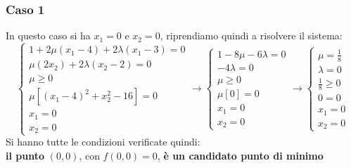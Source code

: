 \documentclass[a4paper,12pt, oneside]{book}
\begin{document}
\subsubsection{Caso 1}
In questo caso si ha $x_1=0$ e $x_2=0$, riprendiamo quindi a risolvere
il sistema:
\[\begin{cases}
    1+2\mu(x_1-4)+2\lambda(x_1-3)=0\\
    \mu(2x_2)+2\lambda(x_2-2)=0\\
    \mu\geq 0\\
    \mu[(x_1-4)^2+x_2^2-16]=0\\
    x_1=0 \\
    x_2=0
  \end{cases}\to
  \begin{cases}
    1-8\mu-6\lambda=0\\
    -4\lambda=0\\
    \mu\geq 0\\
    \mu[0]=0\\
    x_1=0 \\
    x_2=0
  \end{cases}\to
    \begin{cases}
    \mu=\frac{1}{8}\\
    \lambda=0\\
    \frac{1}{8}\geq 0\\
    0=0\\
    x_1=0 \\
    x_2=0
  \end{cases}
\]
Si hanno tutte le condizioni verificate quindi:\\
\textbf{il punto} $(0,0)$, con $f(0,0)=0$, \textbf{è
  un candidato punto di minimo}

\newpage
\end{document}
